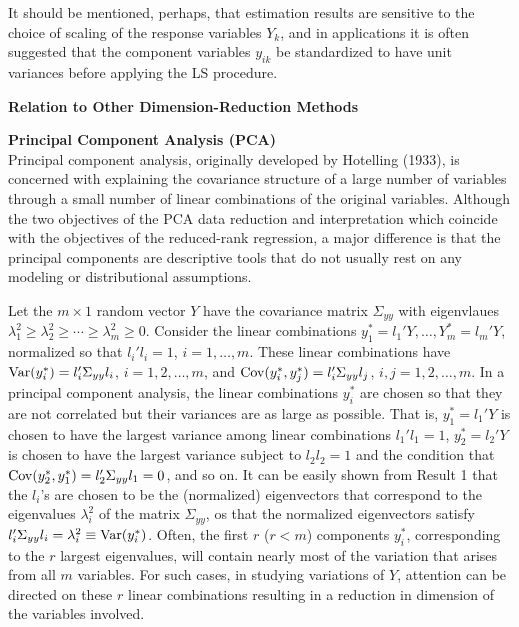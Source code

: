 It should be mentioned, perhaps, that estimation results are sensitive to the choice of scaling of the response variables $Y_k$, and in applications it is often suggested that the component variables $y_{ik}$ be standardized to have unit variances before applying the LS procedure. \\


\begin{center} \textbf{Relation to Other Dimension-Reduction Methods} \newline \\ \end{center}


\noindent \textbf{Principal Component Analysis (PCA)} \\


\noindent Principal component analysis, originally developed by Hotelling (1933), is concerned with explaining the covariance structure of a large number of variables through a small number of linear combinations of the original variables. Although the two objectives of the PCA data reduction and interpretation which coincide with the objectives of the reduced-rank regression, a major difference is that the principal components are descriptive tools that do not usually rest on any modeling or distributional assumptions. 


Let the $m \times 1$ random vector $Y$ have the covariance matrix $\Sigma_{yy}$ with eigenvlaues $\lambda_1^2 \geq \lambda_2^2 \geq \cdots \geq \lambda_m^2 \geq 0$. Consider the linear combinations $y_1^*=l_1'Y,\ldots,Y_m^*= l_m'Y$, normalized so that $l_i' l_i=1$, $i=1,\ldots,m$. These linear combinations have $\operatorname{Var}(y_i^*)=l_i' \Sigma_{yy} l_i$, $i=1,2,\ldots,m$, and $\operatorname{Cov}(y_i^*,y_j^*)=l_i' \Sigma_{yy}l_j$, $i,j=1,2,\ldots,m$. In a principal component analysis, the linear combinations $y_i^*$ are chosen so that they are not correlated but their variances are as large as possible. That is, $y_1^*= l_1'Y$ is chosen to have the largest variance among linear combinations $l_1' l_1=1$, $y_2^*= l_2'Y$ is chosen to have the largest variance subject to $l_2l_2=1$ and the condition that $\operatorname{Cov}(y_2^*,y_1^*)=l_2'\Sigma_{yy}l_1=0$, and so on. It can be easily shown from Result 1 that the $l_i$'s are chosen to be the (normalized) eigenvectors that correspond to the eigenvalues $\lambda_i^2$ of the matrix $\Sigma_{yy}$, os that the normalized eigenvectors satisfy $l_i' \Sigma_{yy}l_i=\lambda_i^2\equiv \operatorname{Var}(y_i^*)$. Often, the first $r$ ($r<m$) components $y_i^*$, corresponding to the $r$ largest eigenvalues, will contain nearly most of the variation that arises from all $m$ variables. For such cases, in studying variations of $Y$, attention can be directed on these $r$ linear combinations resulting in a reduction in dimension of the variables involved. 



